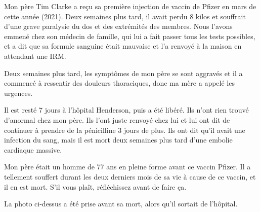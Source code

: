 Mon père Tim Clarke a reçu sa première injection de vaccin de Pfizer en mars de
cette année (2021). Deux semaines plus tard, il avait perdu 8 kilos et souffrait
d'une grave paralysie du dos et des extrémités des membres. Nous l'avons emmené
chez son médecin de famille, qui lui a fait passer tous les tests possibles, et
a dit que sa formule sanguine était mauvaise et l'a renvoyé à la maison en
attendant une IRM.

Deux semaines plus tard, les symptômes de mon père se sont aggravés et il a
commencé à ressentir des douleurs thoraciques, donc ma mère a appelé les
urgences.

Il est resté 7 jours à l'hôpital Henderson, puis a été libéré. Ils n'ont rien
trouvé d'anormal chez mon père. Ils l'ont juste renvoyé chez lui et lui ont dit
de continuer à prendre de la pénicilline 3 jours de plus. Ils ont dit qu'il
avait une infection du sang, mais il est mort deux semaines plus tard d'une
embolie cardiaque massive.

Mon père était un homme de 77 ans en pleine forme avant ce vaccin Pfizer. Il a
tellement souffert durant les deux derniers mois de sa vie à cause de ce vaccin,
et il en est mort. S'il vous plaît, réfléchissez avant de faire ça.

La photo ci-dessus a été prise avant sa mort, alors qu'il sortait de l'hôpital.

